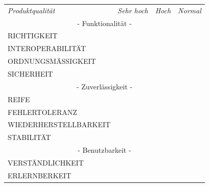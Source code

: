 \documentclass[a4paper]{scrreprt}
\begin{document}
    	\begin{table}[h!]
    		\centering
    		\begin{tabular}{llll}
    			\multicolumn{1}{l}{\textit{Produktqualität}}& \multicolumn{1}{c}{\textit{Sehr hoch}} & \multicolumn{1}{c}{\textit{Hoch}} & \multicolumn{1}{c}{\textit{Normal}}  \\
    			\multicolumn{4}{c}{- Funktionalität -} \\
    			RICHTIGKEIT                                  &                                        &                                   &                                      \\
    			INTEROPERABILITÄT                            &                                        &                                   &                                      \\
    			ORDNUNGSMÄSSIGKEIT                           &                                        &                                   &                                      \\
    			SICHERHEIT                                   &                                        &                                   &                                      \\
    			\multicolumn{4}{c}{- Zuverlässigkeit -}\\
    			REIFE                                        &                                        &                                   &                                      \\
    			FEHLERTOLERANZ                               &                                        &                                   &                                      \\
    			WIEDERHERSTELLBARKEIT                        &                                        &                                   &                                      \\
    			STABILITÄT                                   &                                        &                                   &                                      \\
    			\multicolumn{4}{c}{- Benutzbarkeit -}\\
    			VERSTÄNDLICHKEIT                             &                                        &                                   &                                      \\
    			ERLERNBERKEIT                                &                                        &                                   &                                      \\

\end{tabular}
\end{table}
\end{document}
